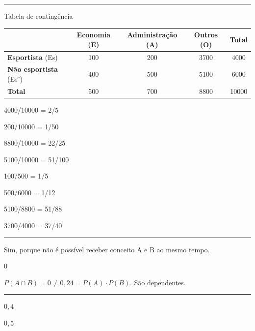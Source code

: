 \documentclass[a4paper,11pt,fleqn]{article}\usepackage[]{graphicx}\usepackage[]{color}
\theoremstyle{definition}
\begin{document}
\begin{compactenum}
\vspace{0.3cm}
\hrule
\vspace{0.3cm}

\item Tabela de contingência \\
  \begin{table}[h]
    \centering
    \begin{tabular}{lcccc}
      \hline
      & \textbf{Economia} (E) & \textbf{Administração} (A) & \textbf{Outros} (O) &
      \textbf{Total} \\
      \hline
      \textbf{Esportista} (Es) & 100 & 200 & 3700 & 4000 \\
      \textbf{Não esportista} (Es$^c$) & 400 & 500 & 5100 & 6000 \\
      \hline
      \textbf{Total} & 500 & 700 & 8800 & 10000 \\
      \hline
    \end{tabular}
  \end{table}

  \begin{inparaenum}
  \item 4000/10000 = 2/5
  \item 200/10000 = 1/50
  \item 8800/10000 = 22/25
  \item 5100/10000 = 51/100
  \item 100/500 = 1/5
  \item 500/6000 = 1/12
  \item 5100/8800 = 51/88
  \item 3700/4000 = 37/40
  \end{inparaenum}

\vspace{0.3cm}
\hrule
\vspace{0.3cm}

\item
  \begin{compactenum}
  \item Sim, porque não é possível receber conceito A e B ao mesmo
    tempo.
  \item 0
  \item $P(A \cap B) = 0 \neq 0,24 = P(A) \cdot P(B)$. São dependentes.
  \end{compactenum}

\vspace{0.3cm}
\hrule
\vspace{0.3cm}

\item
  \begin{inparaenum}
  \item $0,4$
  \item $0,5$
  \end{inparaenum}


\end{compactenum}
\end{document}
